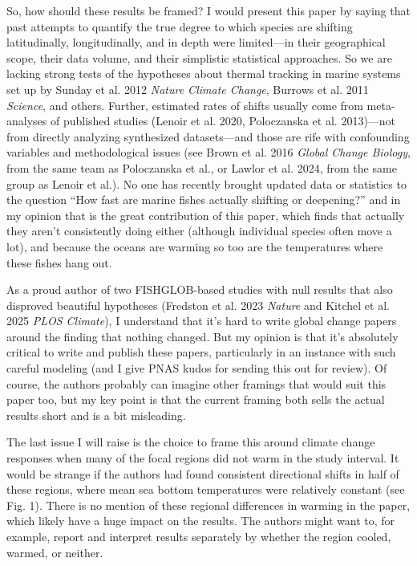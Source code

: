 \documentclass[11pt]{article}
\newcommand{\reviewer}[1]{\par\medskip\noindent\textcolor{revcolor}{#1}\par}
\begin{document}
\reviewer{So, how should these results be framed? I would present this paper by
saying that past attempts to quantify the true degree to which species are shifting
latitudinally, longitudinally, and in depth were limited---in their geographical
scope, their data volume, and their simplistic statistical approaches. So we are
lacking strong tests of the hypotheses about thermal tracking in marine systems set
up by Sunday et al. 2012 \textit{Nature Climate Change}, Burrows et al. 2011
\textit{Science}, and others. Further, estimated rates of shifts usually come from
meta-analyses of published studies (Lenoir et al. 2020, Poloczanska et al.
2013)---not from directly analyzing synthesized datasets---and those are rife with
confounding variables and methodological issues (see Brown et al. 2016
\textit{Global Change Biology}, from the same team as Poloczanska et al., or Lawlor
et al. 2024, from the same group as Lenoir et al.). No one has recently brought
updated data or statistics to the question ``How fast are marine fishes actually
shifting or deepening?'' and in my opinion that is the great contribution of this
paper, which finds that actually they aren't consistently doing either (although
individual species often move a lot), and because the oceans are warming so too are
the temperatures where these fishes hang out.}

\reviewer{As a proud author of two FISHGLOB-based studies with null results that
also disproved beautiful hypotheses (Fredston et al. 2023 \textit{Nature} and
Kitchel et al. 2025 \textit{PLOS Climate}), I understand that it's hard to write
global change papers around the finding that nothing changed. But my opinion is that
it's absolutely critical to write and publish these papers, particularly in an
instance with such careful modeling (and I give PNAS kudos for sending this out for
review). Of course, the authors probably can imagine other framings that would suit
this paper too, but my key point is that the current framing both sells the actual
results short and is a bit misleading.}

\reviewer{The last issue I will raise is the choice to frame this around climate
change responses when many of the focal regions did not warm in the study interval.
It would be strange if the authors had found consistent directional shifts in half
of these regions, where mean sea bottom temperatures were relatively constant (see
Fig. 1). There is no mention of these regional differences in warming in the paper,
which likely have a huge impact on the results. The authors might want to, for
example, report and interpret results separately by whether the region cooled,
warmed, or neither.}
\end{document}
